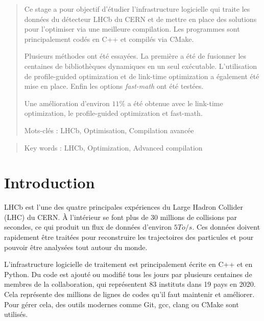 \documentclass[a4paper]{report}
\begin{document}
\begin{abstract}
    Ce stage a pour objectif d'étudier l'infrastructure logicielle qui traite les données du détecteur LHCb du CERN et de mettre en place des solutions pour l'optimiser via une meilleure compilation.
    Les programmes sont principalement codés en C++ et compilés via CMake.

    Plusieurs méthodes ont été essayées.
    La première a été de fusionner les centaines de bibliothèques dynamiques en un seul exécutable.
    L'utilisation de profile-guided optimization et de link-time optimization a également été mise en place.
    Enfin les options \emph{fast-math} ont été testées.

    Une amélioration d'environ $11\%$ a été obtenue avec le link-time optimization, le profile-guided optimization et fast-math.

    \vfill

    Mots-clés : LHCb, Optimisation, Compilation avancée

\end{abstract}

\begin{otherlanguage}{english}
    \begin{abstract}

        \vfill

        Key words : LHCb, Optimization, Advanced compilation
    \end{abstract}
\end{otherlanguage}


\chapter*{Introduction}
LHCb est l'une des quatre principales expériences du Large Hadron Collider (LHC) du CERN.
À l'intérieur se font plus de 30 millions de collisions par secondes, ce qui produit un flux de données d'environ $5 To/s$.
Ces données doivent rapidement être traitées pour reconstruire les trajectoires des particules et pour pouvoir être analysées tout autour du monde.

L'infrastructure logicielle de traitement est principalement écrite en C++ et en Python.
Du code est ajouté ou modifié tous les jours par plusieurs centaines de membres de la collaboration, qui représentent 83 instituts dans 19 pays en 2020.
Cela représente des millions de lignes de codes qu'il faut maintenir et améliorer.
Pour gérer cela, des outils modernes comme Git, gcc, clang ou CMake sont utilisés.
\end{document}
